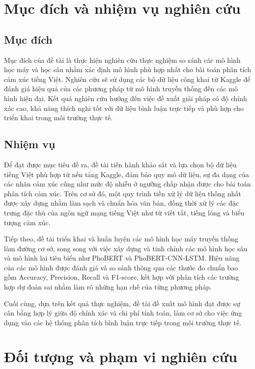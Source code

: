 \documentclass[14pt, a4paper]{report}
\begin{document}
\section{Mục đích và nhiệm vụ nghiên cứu}

\subsection{Mục đích}

Mục đích của đề tài là thực hiện nghiên cứu thực nghiệm so sánh các mô hình học máy và học sâu nhằm xác định mô hình phù hợp nhất cho bài toán phân tích cảm xúc tiếng Việt. Nghiên cứu sẽ sử dụng các bộ dữ liệu công khai từ Kaggle để đánh giá hiệu quả của các phương pháp từ mô hình truyền thống đến các mô hình hiện đại. Kết quả nghiên cứu hướng đến việc đề xuất giải pháp có độ chính xác cao, khả năng thích nghi tốt với dữ liệu bình luận trực tiếp và phù hợp cho triển khai trong môi trường thực tế.

\subsection{Nhiệm vụ}

Để đạt được mục tiêu đề ra, đề tài tiến hành khảo sát và lựa chọn bộ dữ liệu tiếng Việt phù hợp từ nền tảng Kaggle, đảm bảo quy mô dữ liệu, sự đa dạng của các nhãn cảm xúc cũng như mức độ nhiễu ở ngưỡng chấp nhận được cho bài toán phân tích cảm xúc. Trên cơ sở đó, một quy trình tiền xử lý dữ liệu thống nhất được xây dựng nhằm làm sạch và chuẩn hóa văn bản, đồng thời xử lý các đặc trưng đặc thù của ngôn ngữ mạng tiếng Việt như từ viết tắt, tiếng lóng và biểu tượng cảm xúc.

Tiếp theo, đề tài triển khai và huấn luyện các mô hình học máy truyền thống làm đường cơ sở, song song với việc xây dựng và tinh chỉnh các mô hình học sâu và mô hình lai tiêu biểu như PhoBERT và PhoBERT-CNN-LSTM. Hiệu năng của các mô hình được đánh giá và so sánh thông qua các thước đo chuẩn bao gồm Accuracy, Precision, Recall và F1-score, kết hợp với phân tích các trường hợp dự đoán sai nhằm làm rõ những hạn chế của từng phương pháp.

Cuối cùng, dựa trên kết quả thực nghiệm, đề tài đề xuất mô hình đạt được sự cân bằng hợp lý giữa độ chính xác và chi phí tính toán, làm cơ sở cho việc ứng dụng vào các hệ thống phân tích bình luận trực tiếp trong môi trường thực tế.

\section{Đối tượng và phạm vi nghiên cứu}
\end{document}

